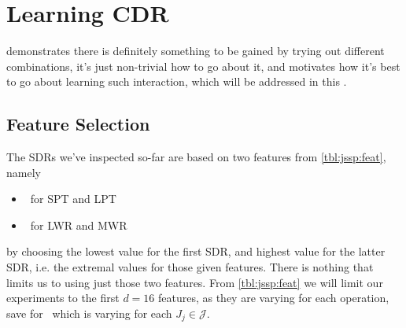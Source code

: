 \documentclass[smallextended]{svjour3}
\begin{document}
\begin{comment}
\begin{figure}
\centering
\texttt{[image: figures/\{j.rnd]}/{trdat.prob.moveIsOptimal.10x10.feat.minmax}.pdf}
\caption{Probability of extremal feature being optimal for \jrnd{10}{10}}
\label{fig:j.rnd:opt:minmax}
\end{figure}
\begin{figure}
\centering
\texttt{[image: figures/\{j.rndn]}/{trdat.prob.moveIsOptimal.10x10.feat.minmax}.pdf}
\caption{Probability of extremal feature being optimal for \jrndn{10}{10}}
\label{fig:j.rndn:opt:minmax}
\end{figure}

\begin{figure}
\centering
\texttt{[image: figures/\{f.rnd]}/{trdat.prob.moveIsOptimal.10x10.feat.minmax}.pdf}
\caption{Probability of extremal feature being optimal for \frnd{10}{10}}
\label{fig:f.rnd:opt:minmax}
\end{figure}
\end{comment}

\section{Learning CDR}\label{ch:expr:CDR}
 demonstrates there is definitely something to be gained by trying out different combinations, it's just non-trivial how to go about it, and motivates how it's best to go about learning such interaction, which will be addressed in this .

\subsection{Feature Selection}
The SDRs we've inspected so-far are based on two features from \cref{tbl:jssp:feat}, namely
\begin{itemize}
\item \phiproc\ for SPT and LPT 
\item \phiwrmJob\ for LWR and MWR 
\end{itemize}
by choosing the lowest value for the first SDR, and highest value for the latter SDR, i.e. the extremal values for those given features. 
There is nothing that limits us to using just those two features. 
From \cref{tbl:jssp:feat} we will limit our experiments to the first $d=16$ features, as they are varying for each operation, save for \phitotalProc\ which is varying for each $J_j\in\mathcal{J}$. 
\end{document}
